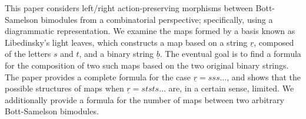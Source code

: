
This paper considers left/right action-preserving morphisms between Bott-Samelson bimodules from a combinatorial perspective; specifically, using a diagrammatic representation.  We examine the maps formed by a basis known as Libedinsky's light leaves, which constructs a map based on a string $\underline r$, composed of the letters $s$ and $t$, and a binary string $\underline b$.  The eventual goal is to find a formula for the composition of two such maps based on the two original binary strings.  The paper provides a complete formula for the case $\underline r = sss\dots$, and shows that the possible structures of maps when $\underline r = ststs\dots$ are, in a certain sense, limited.  We additionally provide a formula for the number of maps between two arbitrary Bott-Samelson bimodules.
